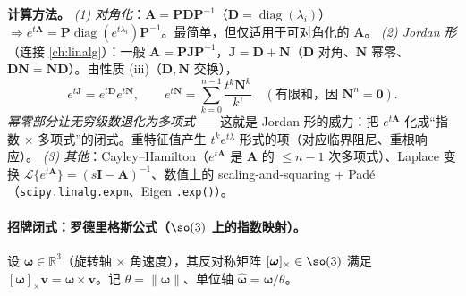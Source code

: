\textbf{计算方法。}
\emph{(1) 对角化}：$\mathbf{A}=\mathbf{P}\mathbf{D}\mathbf{P}^{-1}$（$\mathbf{D}=\operatorname{diag}(\lambda_i)$）$\Rightarrow e^{t\mathbf{A}}=\mathbf{P}\operatorname{diag}(e^{t\lambda_i})\mathbf{P}^{-1}$。最简单，但仅适用于可对角化的 $\mathbf{A}$。
\emph{(2) Jordan 形}（连接 \cref{ch:linalg}）：一般 $\mathbf{A}=\mathbf{P}\mathbf{J}\mathbf{P}^{-1}$，$\mathbf{J}=\mathbf{D}+\mathbf{N}$（$\mathbf{D}$ 对角、$\mathbf{N}$ 幂零、$\mathbf{D}\mathbf{N}=\mathbf{N}\mathbf{D}$）。由性质 (iii)（$\mathbf{D},\mathbf{N}$ 交换），
\begin{equation}
  e^{t\mathbf{J}}=e^{t\mathbf{D}}e^{t\mathbf{N}},\qquad e^{t\mathbf{N}}=\sum_{k=0}^{n-1}\frac{t^k\mathbf{N}^k}{k!}\quad(\text{有限和，因 }\mathbf{N}^n=\mathbf{0}).
  \label{eq:expm-jordan}
\end{equation}
\emph{幂零部分让无穷级数退化为多项式}——这就是 Jordan 形的威力：把 $e^{t\mathbf{A}}$ 化成“指数 $\times$ 多项式”的闭式。重特征值产生 $t^k e^{t\lambda}$ 形式的项（对应临界阻尼、重根响应）。
\emph{(3) 其他}：Cayley--Hamilton（$e^{t\mathbf{A}}$ 是 $\mathbf{A}$ 的 $\le n-1$ 次多项式）、Laplace 变换 $\mathcal{L}\{e^{t\mathbf{A}}\}=(s\mathbf{I}-\mathbf{A})^{-1}$、数值上的 scaling-and-squaring $+$ Padé（\texttt{scipy.\allowbreak linalg.\allowbreak expm}、Eigen \texttt{.exp()}）。

\paragraph{招牌闭式：罗德里格斯公式（$\so(3)$ 上的指数映射）。}
设 $\boldsymbol{\omega}\in\mathbb{R}^3$（旋转轴 $\times$ 角速度），其反对称矩阵 $[\boldsymbol{\omega}]_\times\in\so(3)$ 满足 $[\boldsymbol{\omega}]_\times\mathbf{v}=\boldsymbol{\omega}\times\mathbf{v}$。记 $\theta=\|\boldsymbol{\omega}\|$、单位轴 $\hat{\boldsymbol{\omega}}=\boldsymbol{\omega}/\theta$。

